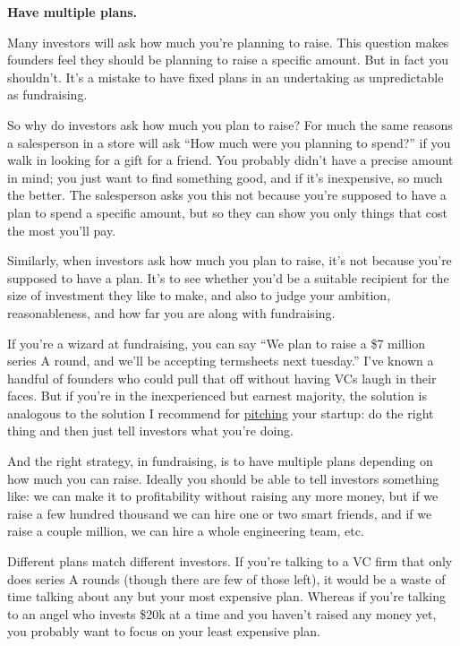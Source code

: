 \documentclass[12pt]{book}
\begin{document}
\textbf{Have multiple plans.}

Many investors will ask how much you're planning to raise. This question
makes founders feel they should be planning to raise a specific amount.
But in fact you shouldn't. It's a mistake to have fixed plans in an
undertaking as unpredictable as fundraising.

So why do investors ask how much you plan to raise? For much the same
reasons a salesperson in a store will ask ``How much were you planning
to spend?'' if you walk in looking for a gift for a friend. You probably
didn't have a precise amount in mind; you just want to find something
good, and if it's inexpensive, so much the better. The salesperson asks
you this not because you're supposed to have a plan to spend a specific
amount, but so they can show you only things that cost the most you'll
pay.

Similarly, when investors ask how much you plan to raise, it's not
because you're supposed to have a plan. It's to see whether you'd be a
suitable recipient for the size of investment they like to make, and
also to judge your ambition, reasonableness, and how far you are along
with fundraising.

If you're a wizard at fundraising, you can say ``We plan to raise a \$7
million series A round, and we'll be accepting termsheets next
tuesday.'' I've known a handful of founders who could pull that off
without having VCs laugh in their faces. But if you're in the
inexperienced but earnest majority, the solution is analogous to the
solution I recommend for \href{convince.html}{pitching} your startup: do
the right thing and then just tell investors what you're doing.

And the right strategy, in fundraising, is to have multiple plans
depending on how much you can raise. Ideally you should be able to tell
investors something like: we can make it to profitability without
raising any more money, but if we raise a few hundred thousand we can
hire one or two smart friends, and if we raise a couple million, we can
hire a whole engineering team, etc.

Different plans match different investors. If you're talking to a VC
firm that only does series A rounds (though there are few of those
left), it would be a waste of time talking about any but your most
expensive plan. Whereas if you're talking to an angel who invests \$20k
at a time and you haven't raised any money yet, you probably want to
focus on your least expensive plan.
\end{document}
